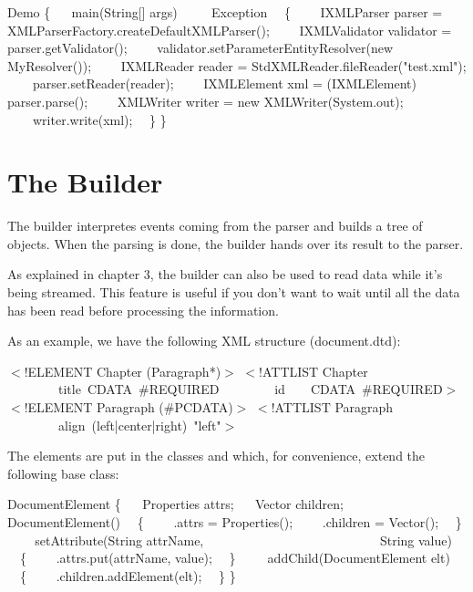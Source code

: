 \begin{example}
 Demo
\{
~~ main(String[] args)
~~~~ Exception
~~\{
~~~~IXMLParser parser = XMLParserFactory.createDefaultXMLParser();
~~~~IXMLValidator validator = parser.getValidator();
~~~~validator.setParameterEntityResolver(new MyResolver());
~~~~IXMLReader reader = StdXMLReader.fileReader("test.xml");
~~~~parser.setReader(reader);
~~~~IXMLElement xml = (IXMLElement) parser.parse();
~~~~XMLWriter writer = new XMLWriter(System.out);
~~~~writer.write(xml);
~~\}
\}
\end{example}


\section{The \NanoXML{} Builder}

The builder interpretes \XML{} events coming from the parser and builds a tree of  objects.
When the parsing is done, the builder hands over its result to the parser.

As explained in chapter 3, the builder can also be used to read \XML{} data while it's being streamed.
This feature is useful if you don't want to wait until all the data has been read before processing the information.

As an example, we have the following XML structure (document.dtd):

\begin{example}
$<$!ELEMENT Chapter (Paragraph*)$>$
$<$!ATTLIST Chapter
~~~~~~~~title~CDATA~\#REQUIRED
~~~~~~~~id~~~~CDATA~\#REQUIRED$>$
$<$!ELEMENT Paragraph (\#PCDATA)$>$
$<$!ATTLIST Paragraph
~~~~~~~~align~(left|center|right)~"left"$>$
\end{example}

The elements are put in the  classes  and  which, for convenience, extend the following base class:

\begin{example}
 DocumentElement
\{
~~ Properties attrs;
~~ Vector children;
~
~~ DocumentElement()
~~\{
~~~~.attrs =  Properties();
~~~~.children =  Vector();
~~\}
~
~~ setAttribute(String attrName,
~~~~~~~~~~~~~~~~~~~~~~~~~~~String value)
~~\{
~~~~.attrs.put(attrName, value);
~~\}
~
~~ addChild(DocumentElement elt)
~~\{
~~~~.children.addElement(elt);
~~\}
\}
\end{example}

